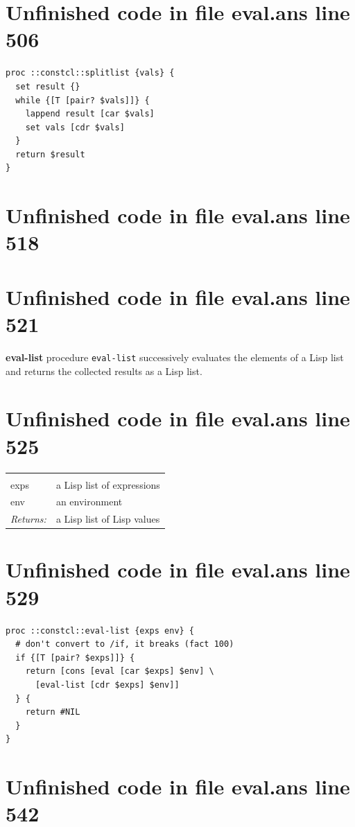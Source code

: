 \documentclass[twoside,9pt]{report}
\begin{document}
\section{Unfinished code in file eval.ans line 506}
\begin{lstlisting}
proc ::constcl::splitlist {vals} {
  set result {}
  while {[T [pair? $vals]]} {
    lappend result [car $vals]
    set vals [cdr $vals]
  }
  return $result
}
\end{lstlisting}
\section{Unfinished code in file eval.ans line 518}

\section{Unfinished code in file eval.ans line 521}

\textbf{eval-list} procedure \texttt{eval-list} successively evaluates the elements of a Lisp list and returns the collected results as a Lisp list.

\section{Unfinished code in file eval.ans line 525}
\noindent\begin{tabular}{ |p{1.9cm} p{8cm}| }
\hline
\rowcolor[HTML]{CCCCCC} \multicolumn{2}{|l|}{\bf eval-list (internal)} \\
exps & a Lisp list of expressions \\
env & an environment \\
\textit{Returns:} & a Lisp list of Lisp values \\
\hline
\end{tabular}
\section{Unfinished code in file eval.ans line 529}
\begin{lstlisting}
proc ::constcl::eval-list {exps env} {
  # don't convert to /if, it breaks (fact 100)
  if {[T [pair? $exps]]} {
    return [cons [eval [car $exps] $env] \
      [eval-list [cdr $exps] $env]]
  } {
    return #NIL
  }
}
\end{lstlisting}
\section{Unfinished code in file eval.ans line 542}
\end{document}
